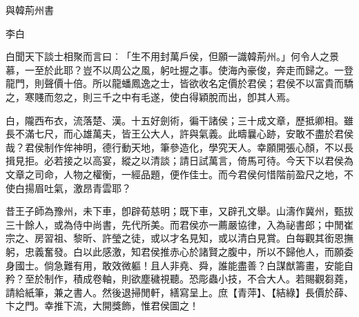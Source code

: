 與韓荊州書

李白

白聞天下談士相聚而言曰︰「生不用封萬戶侯，但願一識韓荊州。」何令人之景慕，一至於此耶？豈不以周公之風，躬吐握之事。使海內豪俊，奔走而歸之。一登龍門，則聲價十倍。所以龍蟠鳳逸之士，皆欲收名定價於君侯；君侯不以富貴而驕之，寒賤而忽之，則三千之中有毛遂，使白得穎脫而出，卽其人焉。

白，隴西布衣，流落楚、漢。十五好劍術，徧干諸侯；三十成文章，歷抵卿相。雖長不滿七尺，而心雄萬夫，皆王公大人，許與氣義。此疇曩心跡，安敢不盡於君侯哉？君侯制作侔神明，德行動天地，筆參造化，學究天人。幸願開張心顏，不以長揖見拒。必若接之以高宴，縱之以清談；請日試萬言，倚馬可待。今天下以君侯為文章之司命，人物之權衡，一經品題，便作佳士。而今君侯何惜階前盈尺之地，不使白揚眉吐氣，激昂青雲耶？

昔王子師為豫州，未下車，卽辟荀慈明；既下車，又辟孔文舉。山濤作冀州，甄拔三十餘人，或為侍中尚書，先代所美。而君侯亦一薦嚴協律，入為祕書郎；中閒崔宗之、房習祖、黎昕、許瑩之徒，或以才名見知，或以清白見賞。白每觀其銜恩撫躬，忠義奮發。白以此感激，知君侯推赤心於諸賢之腹中，所以不歸他人，而願委身國士。倘急難有用，敢效微軀！且人非堯、舜，誰能盡善？白謀猷籌畫，安能自矜？至於制作，積成卷軸，則欲塵穢視聽。恐彫蟲小技，不合大人。若賜觀芻蕘，請給紙筆，兼之書人。然後退掃閒軒，繕寫呈上。庶【青萍】、【結綠】長價於薛、卞之門。幸推下流，大開獎飾，惟君侯圖之！